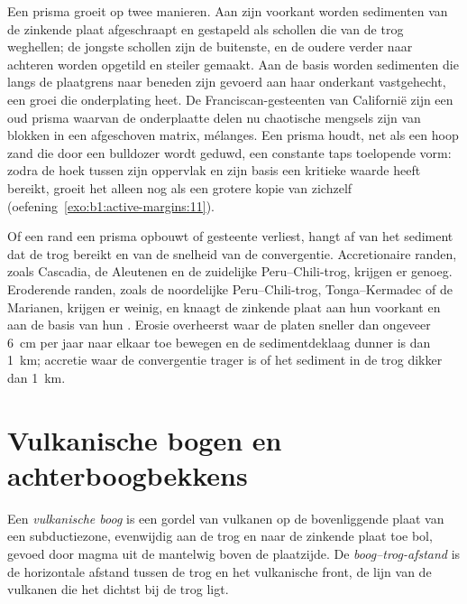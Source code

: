 Een prisma groeit op twee manieren. Aan zijn voorkant worden sedimenten van de zinkende plaat afgeschraapt en gestapeld als schollen die van de trog weghellen; de jongste schollen zijn de buitenste, en de oudere verder naar achteren worden opgetild en steiler gemaakt. Aan de basis worden sedimenten die langs de plaatgrens naar beneden zijn gevoerd aan haar onderkant vastgehecht, een groei die onderplating heet. De Franciscan-gesteenten van Californië zijn een oud prisma waarvan de onderplaatte delen nu chaotische mengsels zijn van blokken in een afgeschoven matrix, mélanges. Een prisma houdt, net als een hoop zand die door een bulldozer wordt geduwd, een constante taps toelopende vorm: zodra de hoek tussen zijn oppervlak en zijn basis een kritieke waarde heeft bereikt, groeit het alleen nog als een grotere kopie van zichzelf (oefening~\ref{exo:b1:active-margins:11}).

Of een rand een prisma opbouwt of gesteente verliest, hangt af van het sediment dat de trog bereikt en van de snelheid van de convergentie. Accretionaire randen, zoals Cascadia, de Aleutenen en de zuidelijke Peru--Chili-trog, krijgen er genoeg. Eroderende randen, zoals de noordelijke Peru--Chili-trog, Tonga--Kermadec of de Marianen, krijgen er weinig, en knaagt de zinkende plaat aan hun voorkant en aan de basis van hun . Erosie overheerst waar de platen sneller dan ongeveer \qty{6}{cm} per jaar naar elkaar toe bewegen en de sedimentdeklaag dunner is dan \qty{1}{km}; accretie waar de convergentie trager is of het sediment in de trog dikker dan \qty{1}{km}.

\section{Vulkanische bogen en achterboogbekkens}\label{sec:b1:active-margins:arcs}

\begin{definition}\label{def:b1:active-margins:volcanic-arc}
Een \emph{vulkanische boog} is een gordel van vulkanen op de bovenliggende plaat van een subductiezone, evenwijdig aan de trog en naar de zinkende plaat toe bol, gevoed door magma uit de mantelwig boven de plaatzijde. De \emph{boog--trog-afstand} is de horizontale afstand tussen de trog en het vulkanische front, de lijn van de vulkanen die het dichtst bij de trog ligt.
\end{definition}

